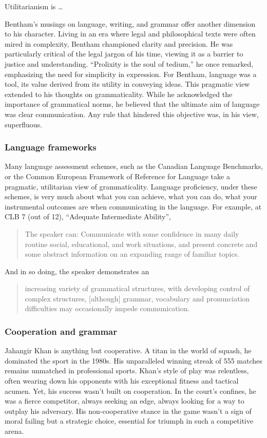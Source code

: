 Utilitarianism is \dots

Bentham's musings on language, writing, and grammar offer another dimension to his character. Living in an era where legal and philosophical texts were often mired in complexity, Bentham championed clarity and precision. He was particularly critical of the legal jargon of his time, viewing it as a barrier to justice and understanding. ``Prolixity is the soul of tedium,'' he once remarked, emphasizing the need for simplicity in expression. For Bentham, language was a tool, its value derived from its utility in conveying ideas. This pragmatic view extended to his thoughts on grammaticality. While he acknowledged the importance of grammatical norms, he believed that the ultimate aim of language was clear communication. Any rule that hindered this objective was, in his view, superfluous.

\subsubsection{Language frameworks}

Many language assessment schemes, such as the Canadian Language Benchmarks, or the Common European Framework of Reference for Language take a pragmatic, utilitarian view of grammaticality. Language proficiency, under these schemes, is very much about what you can achieve, what you can do, what your instrumental outcomes are when communicating in the language. For example, at CLB 7 (out of 12), ``Adequate Intermediate Ability'', \begin{quote}
    The speaker can: Communicate with some confidence in many daily routine social, educational, and work situations, and present concrete and some abstract information on an expanding range of familiar topics.
\end{quote} And in so doing, the speaker demonstrates an \begin{quote}
    increasing variety of grammatical structures, with developing control of complex structures, [although] grammar, vocabulary and pronunciation difficulties may occasionally impede communication.
\end{quote}

\subsubsection{Cooperation and grammar}

Jahangir Khan is anything but cooperative. A titan in the world of squash, he dominated the sport in the 1980s. His unparalleled winning streak of 555 matches remains unmatched in professional sports. Khan's style of play was relentless, often wearing down his opponents with his exceptional fitness and tactical acumen. Yet, his success wasn't built on cooperation. In the court's confines, he was a fierce competitor, always seeking an edge, always looking for a way to outplay his adversary. His non-cooperative stance in the game wasn't a sign of moral failing but a strategic choice, essential for triumph in such a competitive arena.

